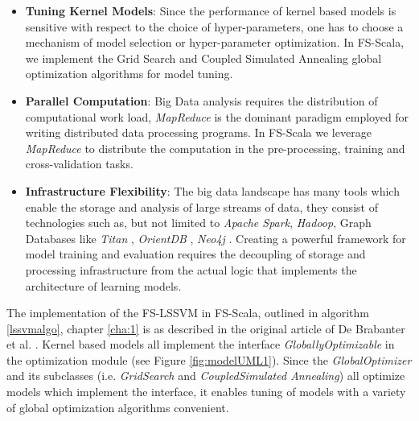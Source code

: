 \begin{itemize}
\item \textbf{Tuning Kernel Models}:
Since the performance of kernel based models is sensitive with respect to the choice of hyper-parameters, one has to choose a mechanism of model selection or hyper-parameter optimization. In FS-Scala, we implement the Grid Search and Coupled Simulated Annealing global optimization algorithms for model tuning.

\item \textbf{Parallel Computation}\label{mr}:
Big Data analysis requires the distribution of computational work load, \textit{MapReduce} is the dominant paradigm employed for writing distributed data processing programs. In FS-Scala we leverage \textit{MapReduce} to distribute the computation in the pre-processing, training and cross-validation tasks.

\item \textbf{Infrastructure Flexibility}:
The big data landscape has many tools which enable the storage and analysis of large streams of data, they consist of technologies such as, but not limited to \textit{Apache Spark}, \textit{Hadoop}, Graph Databases like \textit{Titan} \cite{Titan:2014}, \textit{OrientDB} \cite{OrientDB:2010}, \textit{Neo4j} \cite{Neo4j:2010}. Creating a powerful framework for model training and evaluation requires the decoupling of storage and processing infrastructure from the actual logic that implements the architecture of learning models.
\end{itemize}

The implementation of the FS-LSSVM in FS-Scala, outlined in algorithm \ref{lssvmalgo}, chapter \ref{cha:1} is as described in the original article of De Brabanter et al. \cite{DeBrabanter2010}. Kernel based models all implement the interface \textit{GloballyOptimizable} in the optimization module (see Figure \ref{fig:modelUML1}). Since the \textit{GlobalOptimizer} and its subclasses (i.e. \textit{GridSearch} and \textit{CoupledSimulated Annealing}) all optimize models which implement the  interface, it enables tuning of models with a variety of global optimization algorithms convenient.

